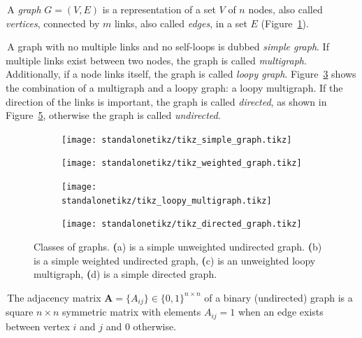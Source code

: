 \noindent\textbullet \,A \emph{graph} $G=(V,E)$ is a representation of a set $V$ of $n$ nodes, also called \emph{vertices}, connected by $m$ links, also called \emph{edges}, in a set $E$ (Figure~\ref{fig:simple_unweighted_graph}).

\noindent\textbullet \,A graph with no multiple links and no self-loops is dubbed \emph{simple graph}.
If multiple links exist between two nodes, the graph is called \emph{multigraph}.
Additionally, if a node links itself, the graph is called \emph{loopy graph}.
Figure~\ref{fig:loopy_multigraph} shows the combination of a multigraph and a loopy graph: a loopy multigraph.
If the direction of the links is important, the graph is called \emph{directed}, as shown in Figure~\ref{fig:directedgraph}, otherwise the graph is called \emph{undirected}.

\begin{figure}[htb!]
\centering
    \begin{subfigure}[hb]{0.4\textwidth}\centering
        \texttt{[image: standalonetikz/tikz\_simple\_graph.tikz]}
        \caption{}
        \label{fig:simple_unweighted_graph}
    \end{subfigure}
    \begin{subfigure}[hb]{0.4\textwidth}\centering
    \texttt{[image: standalonetikz/tikz\_weighted\_graph.tikz]}
    \caption{}
    \label{fig:simple_weighted_graph}
    \end{subfigure}
    \begin{subfigure}[hb]{0.4\textwidth}\centering
    \texttt{[image: standalonetikz/tikz\_loopy\_multigraph.tikz]}
    \caption{}
    \label{fig:loopy_multigraph}
    \end{subfigure}
    \begin{subfigure}[hb]{0.4\textwidth}\centering
    \texttt{[image: standalonetikz/tikz\_directed\_graph.tikz]}
    \caption{}
    \label{fig:directedgraph}
    \end{subfigure}
    \caption{Classes of graphs.
{\textbf (a)} is a simple unweighted undirected graph.
{\textbf (b)} is a simple weighted undirected graph, {\textbf (c)} is an unweighted loopy multigraph, {\textbf (d)} is a simple directed graph.}
\end{figure}

\noindent\textbullet \,The adjacency matrix $\mathbf{A}=\{A_{ij}\} \in \{0,1\}^{n \times n}$ of a binary (undirected) graph is a square $n\times n$ symmetric matrix with elements $A_{ij}=1$ when an edge exists between vertex $i$ and $j$ and $0$ otherwise.

